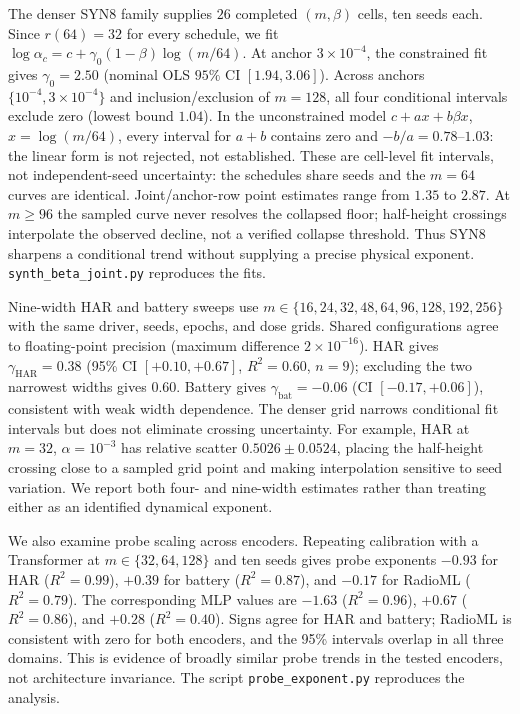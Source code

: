 \documentclass{article}
\begin{document}
The denser SYN8 family supplies $26$ completed $(m,\beta)$ cells, ten seeds each. Since $r(64)=32$ for every schedule, we fit $\log\alpha_c=c+\gamma_0(1-\beta)\log(m/64)$. At anchor $3\times10^{-4}$, the constrained fit gives $\gamma_0=2.50$ (nominal OLS $95\%$ CI $[1.94,3.06]$). Across anchors $\{10^{-4},3\times10^{-4}\}$ and inclusion/exclusion of $m=128$, all four conditional intervals exclude zero (lowest bound $1.04$). In the unconstrained model $c+a x+b\beta x$, $x=\log(m/64)$, every interval for $a+b$ contains zero and $-b/a=0.78$--$1.03$: the linear form is not rejected, not established. These are cell-level fit intervals, not independent-seed uncertainty: the schedules share seeds and the $m=64$ curves are identical. Joint/anchor-row point estimates range from $1.35$ to $2.87$. At $m\ge96$ the sampled curve never resolves the collapsed floor; half-height crossings interpolate the observed decline, not a verified collapse threshold. Thus SYN8 sharpens a conditional trend without supplying a precise physical exponent. \texttt{synth\_beta\_joint.py} reproduces the fits.

Nine-width HAR and battery sweeps use $m\in\{16,24,32,48,64,96,128,192,256\}$ with the same driver, seeds, epochs, and dose grids. Shared configurations agree to floating-point precision (maximum difference $2\times10^{-16}$). HAR gives $\gamma_{\mathrm{HAR}}=0.38$ (95\% CI $[+0.10,+0.67]$, $R^2=0.60$, $n=9$); excluding the two narrowest widths gives $0.60$. Battery gives $\gamma_{\mathrm{bat}}=-0.06$ (CI $[-0.17,+0.06]$), consistent with weak width dependence. The denser grid narrows conditional fit intervals but does not eliminate crossing uncertainty. For example, HAR at $m=32$, $\alpha=10^{-3}$ has relative scatter $0.5026\pm0.0524$, placing the half-height crossing close to a sampled grid point and making interpolation sensitive to seed variation. We report both four- and nine-width estimates rather than treating either as an identified dynamical exponent.

We also examine probe scaling across encoders. Repeating calibration with a Transformer at $m\in\{32,64,128\}$ and ten seeds gives probe exponents $-0.93$ for HAR ($R^2=0.99$), $+0.39$ for battery ($R^2=0.87$), and $-0.17$ for RadioML ($R^2=0.79$). The corresponding MLP values are $-1.63$ ($R^2=0.96$), $+0.67$ ($R^2=0.86$), and $+0.28$ ($R^2=0.40$). Signs agree for HAR and battery; RadioML is consistent with zero for both encoders, and the 95\% intervals overlap in all three domains. This is evidence of broadly similar probe trends in the tested encoders, not architecture invariance. The script \texttt{probe\_exponent.py} reproduces the analysis.
\end{document}
